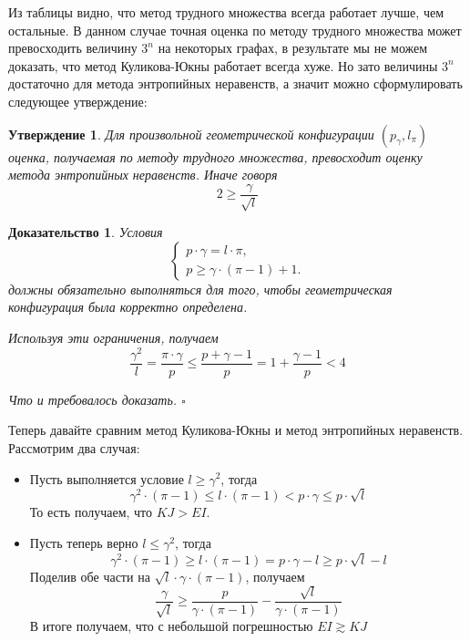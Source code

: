 \documentclass[a4paper]{article}
\newtheorem*{mclaim}{Утверждение}
\newtheorem*{msolution}{Доказательство}
\begin{document}
Из таблицы видно, что метод трудного множества всегда работает лучше, чем остальные. В данном случае 
точная оценка по методу трудного множества может превосходить величину $3^n$ на некоторых графах, в 
результате мы не можем доказать, что метод Куликова-Юкны работает всегда хуже. Но зато величины $3^n$ 
достаточно для метода энтропийных неравенств, а значит можно сформулировать следующее утверждение:

\begin{mclaim}
    Для произвольной геометрической конфигурации $(p_{\gamma}, l_{\pi})$ оценка, получаемая по методу 
    трудного множества, превосходит оценку метода энтропийных неравенств. Иначе говоря 
    $$2 \geq \frac{\gamma}{\sqrt{l}}$$
\end{mclaim}

\begin{msolution}
	Условия 
	\begin{equation*}
	    \begin{cases}
			p\cdot \gamma = l\cdot \pi, \\
			p \geq \gamma\cdot (\pi - 1) + 1.
		\end{cases}
	\end{equation*}
	должны обязательно выполняться для того, чтобы геометрическая конфигурация была корректно определена.
	
	Используя эти ограничения, получаем $$\frac{\gamma^2}{l} = \frac{\pi\cdot\gamma}{p} \leq \frac{p + 
	\gamma - 1}{p} = 1 + \frac{\gamma - 1}{p} < 4$$
	
	Что и требовалось доказать. $\square$
\end{msolution}

Теперь давайте сравним метод Куликова-Юкны и метод энтропийных неравенств. Рассмотрим два случая:
\begin{itemize}[noitemsep]
    \item Пусть выполняется условие $l \geq \gamma^2$, тогда $$\gamma^2 \cdot (\pi - 1) \leq l \cdot (\pi - 1) 
    < p\cdot\gamma \leq p\cdot\sqrt{l}$$ То есть получаем, что $KJ > EI$.
    \item Пусть теперь верно $l \leq \gamma^2$, тогда $$\gamma^2\cdot (\pi - 1) \geq l\cdot(\pi - 1) = 
    p\cdot\gamma - l \geq p\cdot\sqrt{l} - l$$ Поделив обе части на $\sqrt{l}\cdot\gamma\cdot(\pi -1)$, 
    получаем $$\frac{\gamma}{\sqrt{l}} \geq \frac{p}{\gamma\cdot(\pi - 1)} - \frac{\sqrt{l}}{\gamma\cdot(\pi-1)}$$
	В итоге получаем, что с небольшой погрешностью $EI \gtrsim KJ$
\end{itemize}
\end{document}
